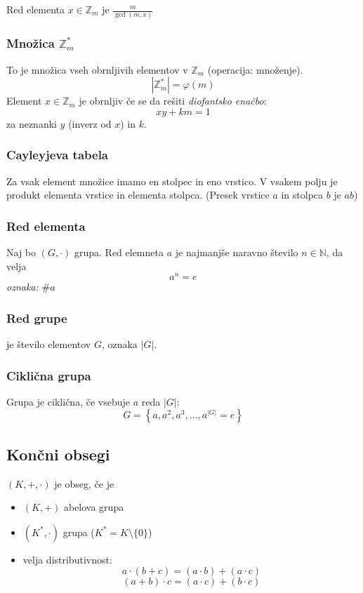 \begin{multicols}{4}
Red elementa $x\in \mathbb{Z}_m$ je $\frac{m}{\gcd(m,x)}$

\subsubsection{Množica $\mathbb{Z}_m^*$}
To je množica vseh obrnljivih elementov v $\mathbb{Z}_m$ (operacija: množenje).
\[|\mathbb{Z}^*_m| = \varphi(m)\]
Element $x\in \mathbb{Z}_m$ je obrnljiv če se da rešiti \emph{diofantsko enačbo}:
\[ xy + km = 1\]
za neznanki $y$ (inverz od $x$) in $k$.

\subsubsection{Cayleyjeva tabela}
Za vsak element množice imamo en stolpec in eno vrstico. V vsakem polju je produkt elementa vrstice in elementa stolpca.
(Presek vrstice $a$ in stolpca $b$ je $ab$)

\subsubsection{Red elementa}
Naj bo $(G,\cdot)$ grupa. Red elemneta $a$ je najmanjše naravno število $n \in \mathbb{N}$, da velja
\[a^n = e\]
\textit{oznaka:} $\#a$

\subsubsection{Red grupe}
je število elementov $G$, oznaka $|G|$.

\subsubsection*{Ciklična grupa}
Grupa je ciklična, če vsebuje $a$ reda $|G|$:
\[ G = \left\{ a, a^2, a^3, \dots, a^{|G|} = e\right\}\]

\subsection*{Končni obsegi}
$(K, +,\cdot)$ je obseg, če je
\begin{itemize}
	\item $(K, +)$ abelova grupa
	\item $(K^*, \cdot)$ grupa ($K^* = K \setminus \{0\}$)
	\item velja distributivnost:
	\[ a \cdot (b+c) = (a\cdot b) + (a \cdot c)\]
	\[ (a+b) \cdot c = (a\cdot c) + (b \cdot c)\]
\end{itemize}


\end{multicols}
